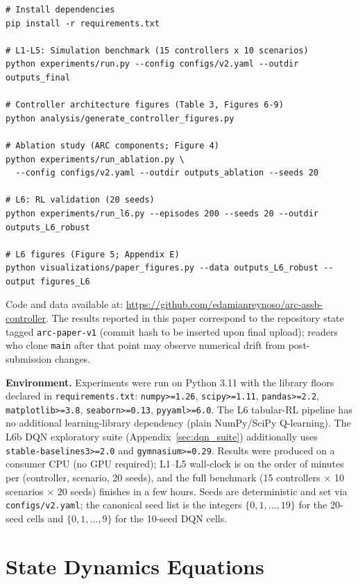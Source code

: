 \documentclass{article}
\begin{document}
\begin{verbatim}
# Install dependencies
pip install -r requirements.txt

# L1-L5: Simulation benchmark (15 controllers x 10 scenarios)
python experiments/run.py --config configs/v2.yaml --outdir outputs_final

# Controller architecture figures (Table 3, Figures 6-9)
python analysis/generate_controller_figures.py

# Ablation study (ARC components; Figure 4)
python experiments/run_ablation.py \
  --config configs/v2.yaml --outdir outputs_ablation --seeds 20

# L6: RL validation (20 seeds)
python experiments/run_l6.py --episodes 200 --seeds 20 --outdir outputs_L6_robust

# L6 figures (Figure 5; Appendix E)
python visualizations/paper_figures.py --data outputs_L6_robust --output figures_L6
\end{verbatim}

Code and data available at: \url{https://github.com/edamianreynoso/arc-assb-controller}. The results reported in this paper correspond to the repository state tagged \texttt{arc-paper-v1} (commit hash to be inserted upon final upload); readers who clone \texttt{main} after that point may observe numerical drift from post-submission changes.

\textbf{Environment.} Experiments were run on Python 3.11 with the library floors declared in \texttt{requirements.txt}: \texttt{numpy>=1.26}, \texttt{scipy>=1.11}, \texttt{pandas>=2.2}, \texttt{matplotlib>=3.8}, \texttt{seaborn>=0.13}, \texttt{pyyaml>=6.0}. The L6 tabular-RL pipeline has no additional learning-library dependency (plain NumPy/SciPy Q-learning). The L6b DQN exploratory suite (Appendix~\ref{sec:dqn_suite}) additionally uses \texttt{stable-baselines3>=2.0} and \texttt{gymnasium>=0.29}. Results were produced on a consumer CPU (no GPU required); L1--L5 wall-clock is on the order of minutes per (controller, scenario, 20 seeds), and the full benchmark (15 controllers $\times$ 10 scenarios $\times$ 20 seeds) finishes in a few hours. Seeds are deterministic and set via \texttt{configs/v2.yaml}; the canonical seed list is the integers $\{0, 1, \ldots, 19\}$ for the 20-seed cells and $\{0, 1, \ldots, 9\}$ for the 10-seed DQN cells.

\section{State Dynamics Equations}
\end{document}

